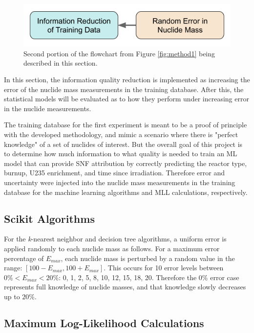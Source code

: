 \begin{figure}[H]
  \centering
  \includegraphics[width=0.7\linewidth]{./chapters/exp1/methodology1_2.png}
  \caption{Second portion of the flowchart from Figure \ref{fig:method1} being 
           described in this section.}
\end{figure}

In this section, the information quality reduction is implemented as increasing
the error of the nuclide mass measurements in the training database. After
this, the statistical models will be evaluated as to how they perform under
increasing error in the nuclide measurements. 

The training database for the first experiment is meant to be a proof of
principle with the developed methodology, and mimic a scenario where there is
"perfect knowledge" of a set of nuclides of interest.  But the overall goal of
this project is to determine how much information to what quality is needed to
train an \gls{ML} model that can provide \gls{SNF} attribution by correctly
predicting the reactor type, burnup, \gls{U235} enrichment, and time since
irradiation.  Therefore error and uncertainty were injected into the nuclide
mass measurements in the training database for the machine learning algorithms
and \gls{MLL} calculations, respectively. 

\subsection{Scikit Algorithms}

For the \textit{k}-nearest neighbor and decision tree algorithms, a uniform
error is applied randomly to each nuclide mass as follows.  For a maximum error
percentage of $E_{max}$, each nuclide mass is perturbed by a random value in the
range: $[100-E_{max},100+E_{max}]$.  This occurs for 10 error levels between
$0\% < E_{max} < 20\%$: 0, 1, 2, 5, 8, 10, 12, 15, 18, 20. Therefore the $0\%$
error case represents full knowledge of nuclide masses, and that knowledge
slowly decreases up to $20\%$. 

\subsection{Maximum Log-Likelihood Calculations}

